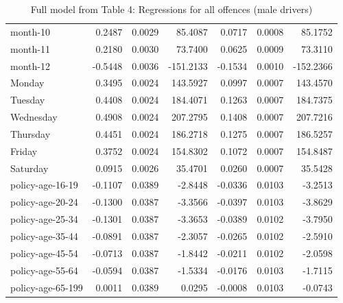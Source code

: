 \documentclass[10pt]{article}
\begin{document}
\begin{table}[ht]
\begin{tabular}{lrrrrrr}
  month-10 & 0.2487 & 0.0029 & 85.4087 & 0.0717 & 0.0008 & 85.1752 \\ 
  month-11 & 0.2180 & 0.0030 & 73.7400 & 0.0625 & 0.0009 & 73.3110 \\ 
  month-12 & -0.5448 & 0.0036 & -151.2133 & -0.1534 & 0.0010 & -152.2366 \\ 
  Monday & 0.3495 & 0.0024 & 143.5927 & 0.0997 & 0.0007 & 143.4570 \\ 
  Tuesday & 0.4408 & 0.0024 & 184.4071 & 0.1263 & 0.0007 & 184.7375 \\ 
  Wednesday & 0.4908 & 0.0024 & 207.2795 & 0.1408 & 0.0007 & 207.7216 \\ 
  Thursday & 0.4451 & 0.0024 & 186.2718 & 0.1275 & 0.0007 & 186.5257 \\ 
  Friday & 0.3752 & 0.0024 & 154.8302 & 0.1072 & 0.0007 & 154.8487 \\ 
  Saturday & 0.0915 & 0.0026 & 35.4701 & 0.0260 & 0.0007 & 35.5428 \\ 
  policy-age-16-19 & -0.1107 & 0.0389 & -2.8448 & -0.0336 & 0.0103 & -3.2513 \\ 
  policy-age-20-24 & -0.1300 & 0.0387 & -3.3566 & -0.0397 & 0.0103 & -3.8629 \\ 
  policy-age-25-34 & -0.1301 & 0.0387 & -3.3653 & -0.0389 & 0.0102 & -3.7950 \\ 
  policy-age-35-44 & -0.0891 & 0.0387 & -2.3057 & -0.0265 & 0.0102 & -2.5910 \\ 
  policy-age-45-54 & -0.0713 & 0.0387 & -1.8442 & -0.0211 & 0.0102 & -2.0598 \\ 
  policy-age-55-64 & -0.0594 & 0.0387 & -1.5334 & -0.0176 & 0.0103 & -1.7115 \\ 
  policy-age-65-199 & 0.0011 & 0.0389 & 0.0295 & -0.0008 & 0.0103 & -0.0743 \\ 
   \hline
\end{tabular}
\caption{Full model from Table 4: Regressions for all offences (male drivers)} 
\label{tab_4_all_pts_with_age_M}
\end{table}


\clearpage
\pagebreak



\end{document}
